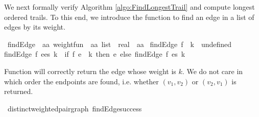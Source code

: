 \begin{isabellebody}
%
\isadelimproof
%
\endisadelimproof
%
\isadelimproof
%
\endisadelimproof
%
\isatagproof
%
\endisatagproof
{\isafoldproof}%
%
\isadelimproof
%
\endisadelimproof
%
\isadelimproof
%
\endisadelimproof
%
\isatagproof
%
\endisatagproof
{\isafoldproof}%
%
\isadelimproof
%
\endisadelimproof
%
\isadelimproof
%
\endisadelimproof
%
\isatagproof
%
\endisatagproof
{\isafoldproof}%
%
\isadelimproof
%
\endisadelimproof
%
\isadelimproof
%
\endisadelimproof
%
\isatagproof
%
\endisatagproof
{\isafoldproof}%
%
\isadelimproof
%
\endisadelimproof
%
\isadelimdocument
%
\endisadelimdocument
%
\isatagdocument
%
\isamarkuptrue%
%
\endisatagdocument
{\isafolddocument}%
%
\isadelimdocument
%
\endisadelimdocument
%
\begin{isamarkuptext}%
\label{section:computeLongestTrail}We next formally verify Algorithm \ref{algo:FindLongestTrail} and compute longest ordered trails. To this end, 
we introduce the function  to find an edge in a list of edges by its weight.%
\end{isamarkuptext}\isamarkuptrue%
\isamarkupfalse%
\ findEdge\ {\isacharcolon}{\isacharcolon}\ {\isachardoublequoteopen}{\isacharparenleft}{\isacharprime}a{\isasymtimes}{\isacharprime}a{\isacharparenright}\ weight{\isacharunderscore}fun\ {\isasymRightarrow}\ {\isacharparenleft}{\isacharprime}a{\isasymtimes}{\isacharprime}a{\isacharparenright}\ list\ {\isasymRightarrow}\ real\ {\isasymRightarrow}\ {\isacharparenleft}{\isacharprime}a{\isasymtimes}{\isacharprime}a{\isacharparenright}{\isachardoublequoteclose}\ \isanewline
{\isachardoublequoteopen}findEdge\ f\ {\isacharbrackleft}{\isacharbrackright}\ k\ {\isacharequal}\ undefined{\isachardoublequoteclose}\ {\isacharbar}\isanewline
{\isachardoublequoteopen}findEdge\ f\ {\isacharparenleft}e{\isacharhash}es{\isacharparenright}\ k\ {\isacharequal}\ {\isacharparenleft}if\ f\ e\ {\isacharequal}\ k\ then\ e\ else\ findEdge\ f\ es\ k{\isacharparenright}{\isachardoublequoteclose}\ \isanewline
%
\isadelimproof
%
\endisadelimproof
%
\isatagproof
%
\endisatagproof
{\isafoldproof}%
%
\isadelimproof
%
\endisadelimproof
%
\begin{isamarkuptext}%
Function  will correctly return the edge whose weight is $k$. We do not care in which order the endpoints
are found, i.e. whether $(v_1,v_2)$ or $(v_2,v_1)$ is returned.%
\end{isamarkuptext}\isamarkuptrue%
\isamarkupfalse%
{\isacharparenleft}\ distinct{\isacharunderscore}weighted{\isacharunderscore}pair{\isacharunderscore}graph{\isacharparenright}\ findEdge{\isacharunderscore}success{\isacharcolon}\isanewline

\end{isabellebody}
